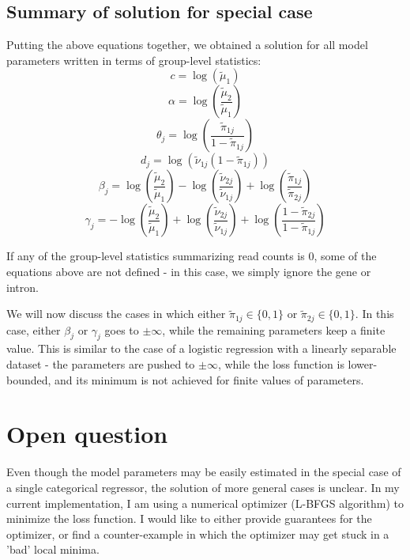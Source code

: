 \documentclass{article}
\begin{document}
	\subsection{Summary of solution for special case}
	Putting the above equations together, we obtained a solution for all model parameters written in terms of group-level statistics:
	$$
	c = \log \left( \tilde{\mu}_1 \right)
	$$	
	$$
	\alpha = \log \left( \frac{\tilde{\mu}_2}{\tilde{\mu}_1}  \right)
	$$
	$$
	\theta_j = \log \left( \frac{\tilde{\pi}_{1j}}{1-\tilde{\pi}_{1j}}\right)
	$$
	$$
	d_j = \log \left( \tilde{\nu}_{1j} \left( 1 - \tilde{\pi}_{1j} \right) \right)
	$$
	$$
	\beta_j = \log \left(\frac{\tilde{\mu}_2}{\tilde{\mu}_1}\right) - \log \left(\frac{\tilde{\nu}_{2j}}{\tilde{\nu}_{1j}}\right) + \log \left(\frac{\tilde{\pi}_{1j}}{\tilde{\pi}_{2j}}\right)
	$$
	$$
	\gamma_j = -\log \left(\frac{\tilde{\mu}_2}{\tilde{\mu}_1}\right) + \log \left(\frac{\tilde{\nu}_{2j}}{\tilde{\nu}_{1j}}\right) + \log \left(\frac{1-\tilde{\pi}_{2j}}{1-\tilde{\pi}_{1j}}\right)
	$$
	
	If any of the group-level statistics summarizing read counts is 0, some of the equations above are not defined - in this case, we simply ignore the gene or intron.
	
	We will now discuss the cases in which either $\tilde{\pi}_{1j} \in \{0, 1\}$ or $\tilde{\pi}_{2j} \in \{0, 1\}$. In this case, either $\beta_j$ or $\gamma_j$ goes to  $\pm \infty$, while the remaining parameters keep a finite value. This is similar to the case of a logistic regression with a linearly separable dataset - the parameters are pushed to $\pm \infty$, while the loss function is lower-bounded, and its minimum is not achieved for finite values of parameters.
	
	
	\section{Open question}
	
	Even though the model parameters may be easily estimated in the special case of a single categorical regressor, the solution of more general cases is unclear. In my current implementation, I am using a numerical optimizer (L-BFGS algorithm) to minimize the loss function. I would like to either provide guarantees for the optimizer, or find a counter-example in which the optimizer may get stuck in a 'bad' local minima.
	
\end{document}
